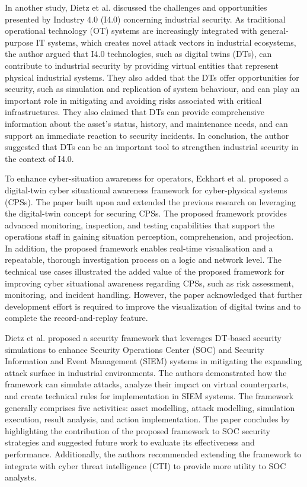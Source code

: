 In another study, Dietz et al.\cite{dietzUnleashingDigitalTwin2020} discussed the challenges and opportunities presented by Industry 4.0 (I4.0) concerning industrial security. As traditional operational technology (OT) systems are increasingly integrated with general-purpose IT systems, which creates novel attack vectors in industrial ecosystems, the author argued that I4.0 technologies, such as digital twins (DTs), can contribute to industrial security by providing virtual entities that represent physical industrial systems. They also added that the DTs offer opportunities for security, such as simulation and replication of system behaviour, and can play an important role in mitigating and avoiding risks associated with critical infrastructures. They also claimed that DTs can provide comprehensive information about the asset's status, history, and maintenance needs, and can support an immediate reaction to security incidents. In conclusion, the author suggested that DTs can be an important tool to strengthen industrial security in the context of I4.0.


To enhance cyber-situation awareness for operators, Eckhart et al.\cite{eckhartEnhancingCyberSituational2019} proposed a digital-twin cyber situational awareness framework for cyber-physical systems (CPSs). The paper built upon and extended the previous research on leveraging the digital-twin concept for securing CPSs. The proposed framework provides advanced monitoring, inspection, and testing capabilities that support the operations staff in gaining situation perception, comprehension, and projection. In addition, the proposed framework enables real-time visualisation and a repeatable, thorough investigation process on a logic and network level. The technical use cases illustrated the added value of the proposed framework for improving cyber situational awareness regarding CPSs, such as risk assessment, monitoring, and incident handling. However, the paper acknowledged that further development effort is required to improve the visualization of digital twins and to complete the record-and-replay feature. 


Dietz et al.\cite{dietzIntegratingDigitalTwin2020} proposed a security framework that leverages DT-based security simulations to enhance Security Operations Center (SOC) and Security Information and Event Management (SIEM) systems in mitigating the expanding attack surface in industrial environments. The authors demonstrated how the framework can simulate attacks, analyze their impact on virtual counterparts, and create technical rules for implementation in SIEM systems. The framework generally comprises five activities: asset modelling, attack modelling, simulation execution, result analysis, and action implementation. The paper concludes by highlighting the contribution of the proposed framework  to SOC security strategies and suggested future work to evaluate its effectiveness and performance. Additionally, the authors recommended extending the framework to integrate with cyber threat intelligence (CTI) to provide more utility to SOC analysts.

